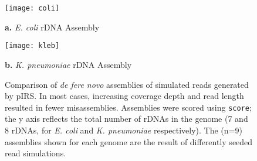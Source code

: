 \begin{figure}[!ht]
  \centering
  \begin{minipage}{.45\textwidth}
    \centering
    \texttt{[image: coli]}

    {\footnotesize \textbf{a.} \textit{E. coli} rDNA Assembly}
    \label{fig:sim_coli}
  \end{minipage}

  \begin{minipage}{.45\textwidth}
    \centering
    \texttt{[image: kleb]} %

    {\footnotesize \textbf{b.} \textit{K. pneumoniae} rDNA Assembly}
    \label{fig:sim_kleb}
  \end{minipage}%
  \caption{Comparison of \textit{de fere novo} assemblies of simulated reads generated by pIRS. In most cases, increasing coverage depth and read length resulted in fewer misassemblies. Assemblies were scored using \texttt{score}; the y axis reflects the total number of rDNAs in the genome (7 and 8 rDNAs, for \textit{E. coli} and \textit{K. pneumoniae} respectively). The (n=9) assemblies shown for each genome are the result of differently seeded read simulations.}
  \label{fig:simreads}
\end{figure}
